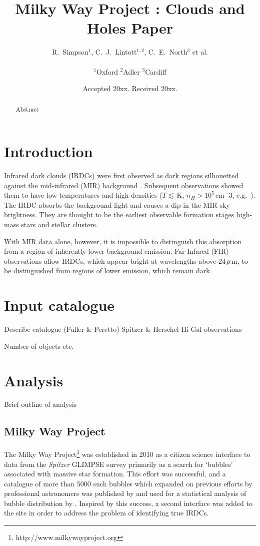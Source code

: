\documentclass[a4,useAMS,usenatbib]{mn2e}
\title{Milky Way Project : Clouds and Holes Paper}
\author[Simpson et al.]{R.~Simpson$^1$, C.~J.~Lintott$^{1,2}$, C.~E.~North$^3$ et al.

\\
$^1$Oxford
$^2$Adler
$^3$Cardiff
}
\def\mic{$\umu$m}
\begin{document}
\date{Accepted 20xx. Received 20xx.}

\pagerange{\pageref{firstpage}--\pageref{lastpage}} 

\maketitle

\label{firstpage}

\begin{abstract}
Abstract
\end{abstract}

\section{Introduction}
Infrared dark clouds (IRDCs) were first observed as dark regions
silhouetted against the mid-infrared (MIR) background
\citep{Wilcock2011}. Subsequent observations showed them to have low
temperatures and high densities ($T\lesssim$\,K, $n_H > 10^5$\,cm$^-3$,
e.g.~\citet{Egan98,Carey98,HennebellePerault02}). The IRDC absorbs the
background light and causes a dip in the MIR sky brightness. They are
thought to be the earliest observable formation stages high-mass stars
and stellar clusters.

With MIR data alone, however, it is impossible to distinguish this
absorption from a region of inherently lower background
emission. Far-Infared (FIR) observations allow IRDCs, which appear
bright at wavelengths above 24\,\mic, to be distinguished from regions
of lower emission, which remain dark. 


\section{Input catalogue}
Describe catalogue (Fuller \& Peretto)
Spitzer \& Herschel Hi-Gal observations

Number of objects etc.

\section{Analysis}
Brief outline of analysis

\subsection{Milky Way Project}
The Milky Way Project\footnote{http://www.milkywayproject.org} was established in 2010 as a citizen science interface to data from the \emph{Spitzer} GLIMPSE survey primarily as a search for `bubbles' associated with massive star formation. This effort was successful, and a catalogue of more than 5000 such bubbles which expanded on previous efforts by professional astronomers was published by \citet{Simpsonetal} and used for a statistical analysis of bubble distribution by \citet{Kendrewetal}. Inspired by this success, a second interface was added to the site in order to address the problem of identifying true IRDCs.
\end{document}
